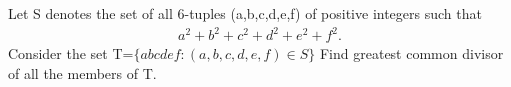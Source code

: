 \item Let S denotes the set of all 6-tuples (a,b,c,d,e,f) of positive integers such that
\begin{align*}
a^{2} + b^{2} + c^{2} + d^{2} + e^{2} + f^{2}.
\end{align*}
Consider the set
T=$\{ abcdef : (a,b,c,d,e,f) \in S\}$
Find greatest common divisor of all the members of T.
 






